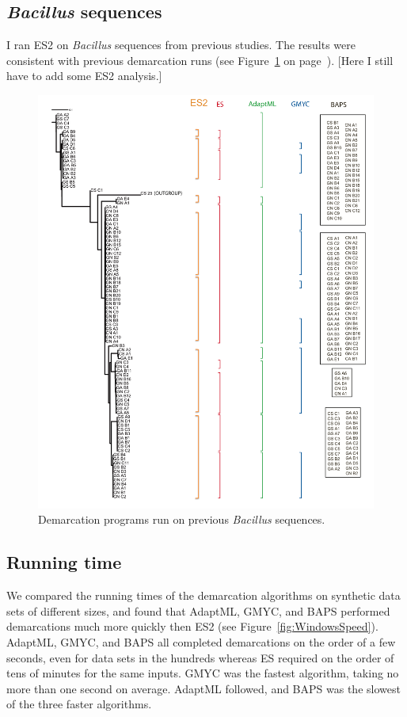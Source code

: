 \subsection*{\emph{Bacillus} sequences}
I ran ES2 on \emph{Bacillus} sequences from previous studies.
The results were consistent with previous demarcation runs (see Figure~\ref{fig:Bacillus} on page~\pageref{fig:Bacillus}). [Here I still have to add some ES2 analysis.]

\begin{figure}[h!]
  \centering
    \includegraphics[scale=0.4]{images/Bacillus-CH4}
      \caption[Demarcation programs run on previous \emph{Bacillus} sequences.]{Demarcation programs run on previous \emph{Bacillus} sequences.}
    \label{fig:Bacillus}
\end{figure}

\subsection*{Running time}
We compared the running times of the demarcation algorithms on synthetic data sets of different sizes, and found that AdaptML, GMYC, and BAPS performed demarcations much more quickly then ES2 (see Figure~\ref{fig:WindowsSpeed}).
AdaptML, GMYC, and BAPS all completed demarcations on the order of a few seconds, even for data sets in the hundreds whereas ES required on the order of tens of minutes for the same inputs.
GMYC was the fastest algorithm, taking no more than one second on average.
AdaptML followed, and BAPS was the slowest of the three faster algorithms.

